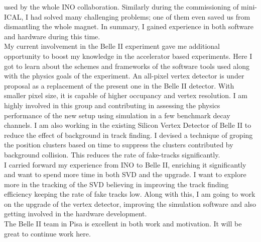 \documentclass[12pt]{article}
\begin{document}
\begin{justify}
  used by the whole INO collaboration. Similarly during the
  commissioning of mini-ICAL, I had solved many challenging problems; one of
  them even saved us from dismantling the whole magnet.
  In summary, I gained experience in both software and hardware during this time.\\
  \hspace*{0.6cm}
  My current involvement in the Belle II experiment gave me additional
  opportunity to boost my knowledge in the accelerator based experiments.
  Here I got to learn about the schemes and frameworks of the software tools
  used along with the physics goals of the experiment.
  An all-pixel vertex detector is under proposal as a replacement of
  the present one in the Belle II detector. With smaller pixel size, it is
  capable of higher occupancy and vertex resolution. I am highly involved
  in this group and contributing in assessing the physics performance of the
  new setup using simulation in a few benchmark decay channels.
  I am also working in the existing Silicon Vertex Detector of Belle II to
  reduce the effect of background in track finding. I devised a technique
  of groping the position clusters based on time to suppress the clusters
  contributed by background collision. This reduces the rate of fake-tracks
  significantly.\\
  \hspace*{0.6cm}
  I carried forward my experience from INO to Belle II, enriching it
  significantly and want to spend more time in both SVD and the upgrade.
  I want to explore more in the tracking of the SVD believing in improving
  the track finding efficiency keeping the rate of fake tracks low. Along with
  this, I am going to work on the upgrade of the vertex detector, improving
  the simulation software and also getting involved in the hardware development.\\
  \hspace*{0.6cm}
  The Belle II team in Pisa is excellent in both work and motivation.
  It will be great to continue work here.

\end{justify}
\end{document}
